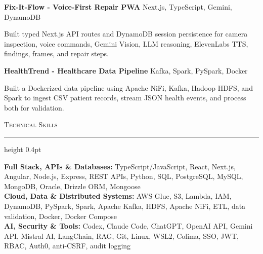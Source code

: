 \documentclass[letterpaper,11pt]{article}
\newcommand{\resumesection}[1]{%
  \par\vspace{2pt}%
  {\large\scshape #1}\par\vspace{2pt}%
  \hrule height 0.4pt\vspace{2pt}%
}
\newcommand{\projectHeading}[2]{
  \textbf{#1} \hfill #2
}
\begin{document}
\projectHeading{Fix-It-Flow - Voice-First Repair PWA}{Next.js, TypeScript, Gemini, DynamoDB}
\begin{tightitemize}
  \item Built typed Next.js API routes and DynamoDB session persistence for camera inspection, voice commands, Gemini Vision, LLM reasoning, ElevenLabs TTS, findings, frames, and repair steps.
\end{tightitemize}

\projectHeading{HealthTrend - Healthcare Data Pipeline}{Kafka, Spark, PySpark, Docker}
\begin{tightitemize}
  \item Built a Dockerized data pipeline using Apache NiFi, Kafka, Hadoop HDFS, and Spark to ingest CSV patient records, stream JSON health events, and process both for validation.
\end{tightitemize}

\resumesection{Technical Skills}
\textbf{Full Stack, APIs \& Databases:} TypeScript/JavaScript, React, Next.js, Angular, Node.js, Express, REST APIs, Python, SQL, PostgreSQL, MySQL, MongoDB, Oracle, Drizzle ORM, Mongoose\\
\textbf{Cloud, Data \& Distributed Systems:} AWS Glue, S3, Lambda, IAM, DynamoDB, PySpark, Spark, Apache Kafka, HDFS, Apache NiFi, ETL, data validation, Docker, Docker Compose\\
\textbf{AI, Security \& Tools:} Codex, Claude Code, ChatGPT, OpenAI API, Gemini API, Mistral AI, LangChain, RAG, Git, Linux, WSL2, Colima, SSO, JWT, RBAC, Auth0, anti-CSRF, audit logging
\end{document}
